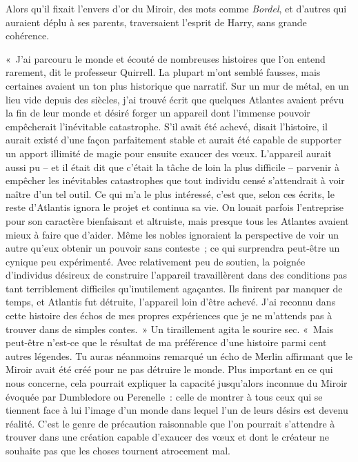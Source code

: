 Alors qu'il fixait l'envers d'or du Miroir, des mots comme \emph{Bordel}, et d'autres qui auraient déplu à ses parents, traversaient l'esprit de Harry, sans grande cohérence.

«~J'ai parcouru le monde et écouté de nombreuses histoires que l'on entend rarement, dit le professeur Quirrell.
La plupart m'ont semblé fausses, mais certaines avaient un ton plus historique que narratif.
Sur un mur de métal, en un lieu vide depuis des siècles, j'ai trouvé écrit que quelques Atlantes avaient prévu la fin de leur monde et désiré forger un appareil dont l'immense pouvoir empêcherait l'inévitable catastrophe.
S'il avait été achevé, disait l'histoire, il aurait existé d'une façon parfaitement stable et aurait été capable de supporter un apport illimité de magie pour ensuite exaucer des vœux.
L'appareil aurait aussi pu -- et il était dit que c'était la tâche de loin la plus difficile -- parvenir à empêcher les inévitables catastrophes que tout individu censé s'attendrait à voir naître d'un tel outil.
Ce qui m'a le plus intéressé, c'est que, selon ces écrits, le reste d'Atlantis ignora le projet et continua sa vie.
On louait parfois l'entreprise pour son caractère bienfaisant et altruiste, mais presque tous les Atlantes avaient mieux à faire que d'aider.
Même les nobles ignoraient la perspective de voir un autre qu'eux obtenir un pouvoir sans conteste~; ce qui surprendra peut-être un cynique peu expérimenté.
Avec relativement peu de soutien, la poignée d'individus désireux de construire l'appareil travaillèrent dans des conditions pas tant terriblement difficiles qu'inutilement agaçantes.
Ils finirent par manquer de temps, et Atlantis fut détruite, l'appareil loin d'être achevé.
J'ai reconnu dans cette histoire des échos de mes propres expériences que je ne m'attends pas à trouver dans de simples contes.~»
Un tiraillement agita le sourire sec.
«~Mais peut-être n'est-ce que le résultat de ma préférence d'une histoire parmi cent autres légendes.
Tu auras néanmoins remarqué un écho de Merlin affirmant que le Miroir avait été créé pour ne pas détruire le monde.
Plus important en ce qui nous concerne, cela pourrait expliquer la capacité jusqu'alors inconnue du Miroir évoquée par Dumbledore ou Perenelle~: celle de montrer à tous ceux qui se tiennent face à lui l'image d'un monde dans lequel l'un de leurs désirs est devenu réalité.
C'est le genre de précaution raisonnable que l'on pourrait s'attendre à trouver dans une création capable d'exaucer des vœux et dont le créateur ne souhaite pas que les choses tournent atrocement mal.

